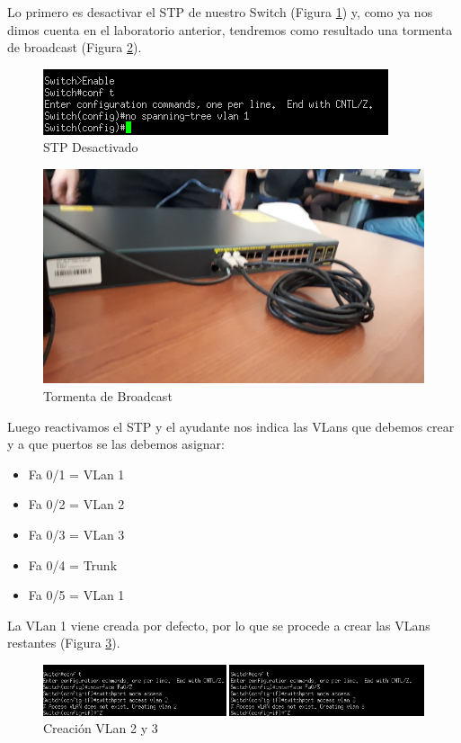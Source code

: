 \documentclass{article}
\begin{document}
Lo primero es desactivar el STP de nuestro Switch (Figura \ref{fig:stpdisable}) y, como ya nos dimos cuenta en el laboratorio anterior, tendremos como resultado una tormenta de broadcast (Figura \ref{fig:tdb}).

\begin{figure}[h!]
\centering
\includegraphics[scale=1]{5_DesactivacionSTP.png}
\caption{STP Desactivado}
\label{fig:stpdisable}
\end{figure}

\begin{figure}[h!]
\centering
\includegraphics[scale=0.15]{STPdisable.jpg}
\caption{Tormenta de Broadcast}
\label{fig:tdb}
\end{figure}

\newpage
Luego reactivamos el STP y el ayudante nos indica las VLans que debemos crear y a que puertos se las debemos asignar:
\begin{itemize}
    \item Fa 0/1 = VLan 1
    \item Fa 0/2 = VLan 2
    \item Fa 0/3 = VLan 3
    \item Fa 0/4 = Trunk
    \item Fa 0/5 = VLan 1
\end{itemize}
La VLan 1 viene creada por defecto, por lo que se procede a crear las VLans restantes (Figura \ref{fig:CreaV}).
\begin{figure}[h!]
\centering
\includegraphics[scale=0.7]{6vlan2y3.png}
\caption{Creación VLan 2 y 3}
\label{fig:CreaV}
\end{figure}
\end{document}
